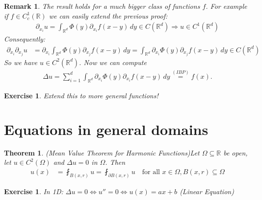 \documentclass{report}
\theoremstyle{tommy}
\newtheorem{thm}[defn]{Theorem}
\newtheorem{rem}[defn]{Remark}
\newtheorem{ex}[defn]{Exercise}
\begin{document}
\begin{rem}
  The result holds for a much bigger class of functions \(f\). For example if \(f \in C_c^1(\mathbb{R})\) we can easily extend the previous proof:
  \begin{align*}
    \partial_{x_i} u = \int_{\mathbb{R}^d} \Phi(y) \partial_{x_i} f(x-y) \, dy \in C(\mathbb{R}^d) \Rightarrow u \in C^1(\mathbb{R}^d)
  \end{align*}
  Consequently: 
  \begin{align*}
    \partial_{x_i} \partial_{x_j} u 
    &= \partial_{x_i} \int_{\mathbb{R}^d} \Phi(y) \partial_{x_j} f(x-y) \, dy
    = \int_{\mathbb{R}^d} \partial_{x_i} \Phi(y) \partial_{x_j} f(x-y) \, dy \in C(\mathbb{R}^d)
  \end{align*}
  So we have \(u \in C^2(\mathbb{R}^d)\). Now we can compute
  \begin{align*}
    \Delta u = \sum_{i=1}^d \int_{\mathbb{R}^d} \partial_{x_i} \Phi(y) \partial_{x_i} f(x-y) \, dy \overset{(IBP)}{=} f(x).
  \end{align*}
\end{rem}

\begin{ex}
  Extend this to more general functions!
\end{ex}

\section{Equations in general domains}
\begin{thm} (Mean Value Theorem for Harmonic Functions)\label{mean-value-theorem} 
  Let \(\Omega \subseteq \mathbb{R}\) be open, let \( u \in C^2(\Omega)\) and \(\Delta u = 0\) in \(\Omega\). Then
  \begin{align*}
    u(x) 
    &= \fint_{B(x, r)} u
    = \fint_{\partial B(x, r)} u \quad \text{for all } x \in \Omega, B(x,r) \subseteq \Omega
  \end{align*}
\end{thm}

\begin{ex}
  In 1D\@: \(\Delta u = 0 \Leftrightarrow u'' = 0 \Leftrightarrow u(x) = ax + b\) (Linear Equation)
\end{ex}
\end{document}
